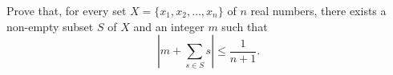 Prove that, for every set $X = \{x_1, x_2, \dots, x_n\}$ of $n$
real numbers, there exists a non-empty subset $S$ of $X$ and an integer $m$
such that
\[
\left| m + \sum_{s \in S} s \right| \leq \frac{1}{n+1}.
\]
